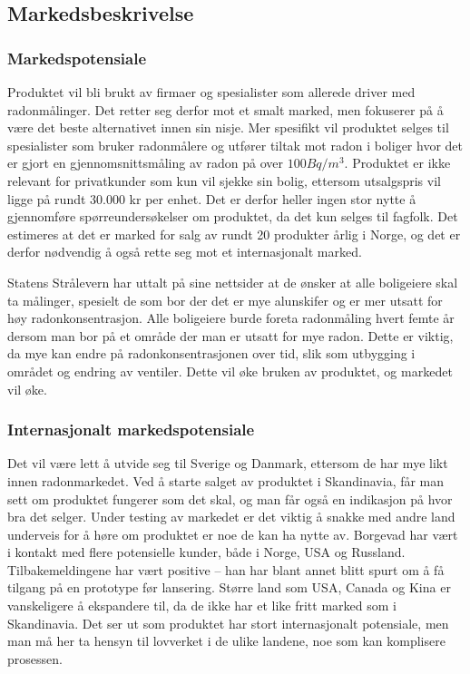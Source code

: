 \subsection{Markedsbeskrivelse}

\subsubsection{Markedspotensiale}

Produktet vil bli brukt av firmaer og spesialister som allerede driver med radonmålinger. Det retter seg derfor mot et smalt marked, men fokuserer på å være det beste alternativet innen sin nisje. Mer spesifikt vil produktet selges til spesialister som bruker radonmålere og utfører tiltak mot radon i boliger hvor det er gjort en gjennomsnittsmåling av radon på over $100 Bq/m^3$. Produktet er ikke relevant for privatkunder som kun vil sjekke sin bolig, ettersom utsalgspris vil ligge på rundt 30.000 kr per enhet. Det er derfor heller ingen stor nytte å gjennomføre spørreundersøkelser om produktet, da det kun selges til fagfolk. Det estimeres at det er marked for salg av rundt 20 produkter årlig i Norge, og det er derfor nødvendig å også rette seg mot et internasjonalt marked.

Statens Strålevern har uttalt på sine nettsider at de ønsker at alle boligeiere skal ta målinger, spesielt de som bor der det er mye alunskifer og er mer utsatt for høy radonkonsentrasjon.
Alle boligeiere burde foreta radonmåling hvert femte år dersom man bor på et område der man er utsatt for mye radon. Dette er viktig, da mye kan endre på radonkonsentrasjonen over tid, slik som utbygging i området og endring av ventiler.
Dette vil øke bruken av produktet, og markedet vil øke.

\subsubsection{Internasjonalt markedspotensiale}

Det vil være lett å utvide seg til Sverige og Danmark, ettersom de har mye likt innen radonmarkedet. Ved å starte salget av produktet i Skandinavia, får man sett om produktet fungerer som det skal, og man får også en indikasjon på hvor bra det selger. Under testing av markedet er det viktig å snakke med andre land underveis for å høre om produktet er noe de kan ha nytte av.
Borgevad har vært i kontakt med flere potensielle kunder, både i Norge, USA og Russland.
Tilbakemeldingene har vært positive – han har blant annet blitt spurt om å få tilgang på en prototype før lansering.
Større land som USA, Canada og Kina er vanskeligere å ekspandere til, da de ikke har et like fritt marked som i Skandinavia.
Det ser ut som produktet har stort internasjonalt potensiale, men man må her ta hensyn til lovverket i de ulike landene, noe som kan komplisere prosessen.

